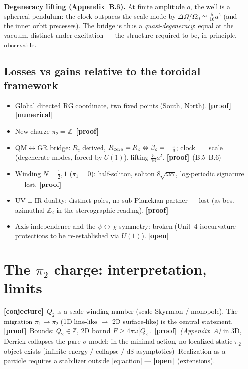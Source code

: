 \documentclass[11pt]{article}
\newcommand{\preuve}{{\small\textbf{[proof]}}}
\newcommand{\num}{{\small\textbf{[numerical]}}}
\newcommand{\conj}{{\small\textbf{[conjecture]}}}
\newcommand{\ouv}{{\small\textbf{[open]}}}
\theoremstyle{definition}
\begin{document}
\textbf{Degeneracy lifting (Appendix~B.6).} At finite amplitude $a$, the well is a spherical pendulum:
the clock outpaces the scale mode by $\Delta\Omega/\Omega_0\simeq\tfrac{5}{16}a^2$ (and the inner orbit
precesses). The bridge is thus a \emph{quasi-degeneracy}: equal at the vacuum, distinct under excitation
--- the structure required to be, in principle, observable.

\subsection{Losses vs gains relative to the toroidal framework}\label{sec:pertes}
\begin{itemize}[nosep,leftmargin=1.4em]
\item[$\oplus$] Global directed RG coordinate, two fixed points (South, North). \preuve\num
\item[$\oplus$] New charge $\pi_2=\mathbb{Z}$. \preuve
\item[$\oplus$] QM$\leftrightarrow$GR bridge: $R_c$ derived, $R_{\rm core}=R_c\Leftrightarrow\beta_c=-\tfrac13$; clock $=$ scale (degenerate modes, forced by $U(1)$), lifting $\tfrac{5}{16}a^2$. \preuve\ (B.5--B.6)
\item[$\ominus$] Winding $N=\tfrac12,1$ ($\pi_1=0$): half-soliton, soliton $8\sqrt{\omega\alpha}$, log-periodic signature --- lost. \preuve
\item[$\ominus$] UV$\equiv$IR duality: distinct poles, no sub-Planckian partner --- lost (at best azimuthal $\mathbb{Z}_2$ in the stereographic reading). \preuve
\item[$\ominus$] Axis independence and the $\psi\!\leftrightarrow\!\chi$ symmetry: broken (Unit~4 isocurvature protections to be re-established via $U(1)$). \ouv
\end{itemize}

\section{The $\pi_2$ charge: interpretation, limits}
\conj\ $Q_2$ is a scale winding number (scale Skyrmion / monopole). The migration
$\pi_1\to\pi_2$ (1D line-like $\to$ 2D surface-like) is the central statement. \preuve\ Bounds:
$Q_2\in\mathbb{Z}$, 2D bound $E\ge4\pi\omega|Q_2|$. \preuve\ \emph{(Appendix~A)} in 3D, Derrick collapses
the pure $\sigma$-model; in the minimal action, no localized static $\pi_2$ object exists
(infinite energy / collapse / dS asymptotics). Realization as a particle requires a stabilizer outside
\eqref{eq:action} --- \ouv\ (extensions).
\end{document}
